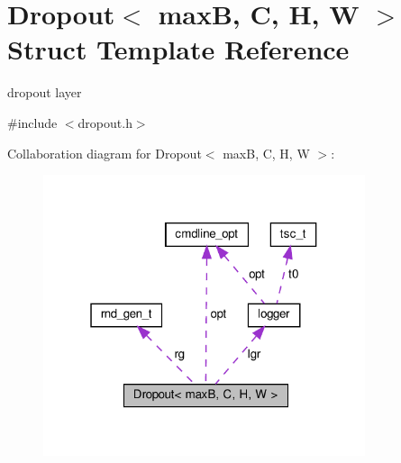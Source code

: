 \hypertarget{structDropout}{}\section{Dropout$<$ maxB, C, H, W $>$ Struct Template Reference}
\label{structDropout}


dropout layer  




{\ttfamily \#include $<$dropout.\+h$>$}



Collaboration diagram for Dropout$<$ maxB, C, H, W $>$\+:\nopagebreak
\begin{figure}[H]
\begin{center}
\leavevmode
\includegraphics[width=268pt]{structDropout__coll__graph}
\end{center}
\end{figure}
